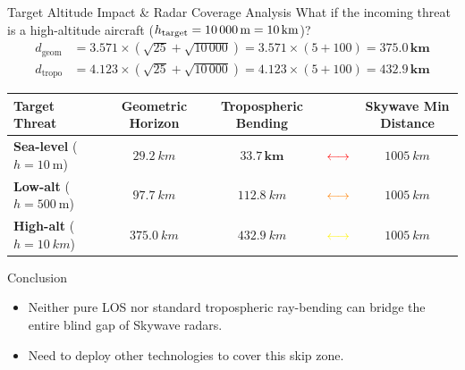 \documentclass[aspectratio=169, 10pt]{beamer}
\newcommand{\km}{km} %
\begin{document}
\begin{frame}{Target Altitude Impact \& Radar Coverage Analysis}
    What if the incoming threat is a high-altitude aircraft ($h_{\text{target}} = \SI{10\,000}{\m} = \SI{10}{\km}$)?
    \begin{align}
        d_{\text{geom}} &= 3.571 \times \left(\sqrt{25} + \sqrt{10\,000}\right) = 3.571 \times (5 + 100) = \mathbf{375.0\,\si{\km}} \\
        d_{\text{tropo}} &= 4.123 \times \left(\sqrt{25} + \sqrt{10\,000}\right) = 4.123 \times (5 + 100) = \mathbf{432.9\,\si{\km}}
    \end{align}

    \begin{table}[h]
        \centering
        \small
        \begin{tabular}{lcccc}
            \toprule
            \textbf{Target Threat} & \textbf{Geometric Horizon} & \textbf{Tropospheric Bending} & & \textbf{Skywave Min Distance} \\ \midrule
            \textbf{Sea-level} ($h=\SI{10}{\m}$) & $\SI{29.2}{\km}$ & $\mathbf{33.7\,\si{\km}}$ & $\mathcolor{red}{\longleftrightarrow}$ & $\SI{1005}{\km}$ \\
            \textbf{Low-alt} ($h=\SI{500}{\m}$) & $\SI{97.7}{\km}$ & $\SI{112.8}{\km}$ & $\mathcolor{orange}{\longleftrightarrow}$ & $\SI{1005}{\km}$ \\
            \textbf{High-alt} ($h=\SI{10}{\km}$) & $\SI{375.0}{\km}$ & $\SI{432.9}{\km}$ & $\mathcolor{yellow}{\longleftrightarrow}$ & $\SI{1005}{\km}$ \\ \bottomrule
        \end{tabular}
    \end{table}

    \begin{alertblock}{Conclusion}
        \begin{itemize}
            \item Neither pure LOS nor standard tropospheric ray-bending can bridge the entire blind gap of Skywave radars.
            \item Need to deploy other technologies to cover this skip zone.
        \end{itemize}
    \end{alertblock}
\end{frame}

\end{document}
